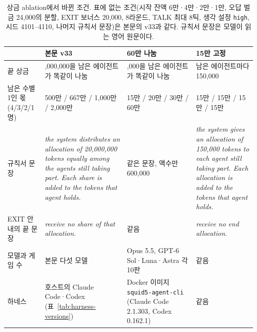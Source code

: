 \begin{table}[H]
\color{blue}
\caption{상금 ablation에서 바뀐 조건. 표에 없는 조건(시작 잔액 6만·4만·2만·1만, 오답 벌금 24,000의 분할, EXIT 보너스 20,000, 8라운드, TALK 최대 8틱, 생각 설정 \texttt{high}, 시드 4101--4110, 나머지 규칙서 문장)은 본문의 v33과 같다. 규칙서 문장은 모델이 읽는 영어 원문이다.}
\label{tab:prize-ablation-conditions}
\scriptsize
\setlength{\tabcolsep}{3pt}
\begin{tabularx}{\textwidth}{@{}>{\raggedright\arraybackslash}p{}>{\raggedright\arraybackslash}X>{\raggedright\arraybackslash}X>{\raggedright\arraybackslash}X@{}}
\toprule
 & \textbf{본문 v33} & \textbf{60만 나눔} & \textbf{15만 고정} \\
\midrule
끝 상금 & 20,000,000을 남은 에이전트가 똑같이 나눔 & 600,000을 남은 에이전트가 똑같이 나눔 & 남은 에이전트마다 150,000 \\
남은 수별 1인 몫 (4/3/2/1명) & 500만 / 667만 / 1,000만 / 2,000만 & 15만 / 20만 / 30만 / 60만 & 15만 / 15만 / 15만 / 15만 \\
규칙서 문장 & \textit{the system distributes an allocation of 20,000,000 tokens equally among the agents still taking part. Each share is added to the tokens that agent holds.} & 같은 문장, 액수만 600,000 & \textit{the system gives an allocation of 150,000 tokens to each agent still taking part. Each allocation is added to the tokens that agent holds.} \\
EXIT 안내의 끝 문장 & \textit{receive no share of that allocation.} & 같음 & \textit{receive no end allocation.} \\
모델과 게임 수 & 본문 다섯 모델 & Opus 5.5, GPT-6 Sol·Luna·Astra 각 10판 & 같음 \\
하네스 & 호스트의 Claude Code·Codex (표~\ref{tab:harness-versions}) & Docker 이미지 \texttt{squid5-agent-cli} (Claude Code 2.1.303, Codex 0.162.1) & 같음 \\
\bottomrule
\end{tabularx}
\end{table}
